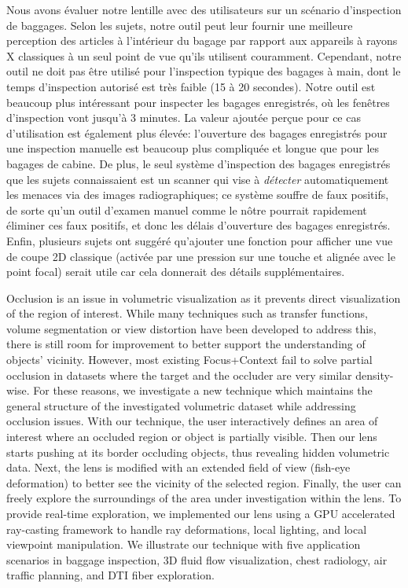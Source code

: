 Nous avons évaluer notre lentille avec des utilisateurs sur un scénario d'inspection de baggages. Selon les sujets, notre outil peut leur fournir une meilleure perception des articles à l’intérieur du bagage par rapport aux appareils à rayons X classiques à un seul point de vue qu’ils utilisent couramment. Cependant, notre outil ne doit pas être utilisé pour l'inspection typique des bagages à main, dont le temps d'inspection autorisé est très faible (15 à 20 secondes). Notre outil est beaucoup plus intéressant pour inspecter les bagages enregistrés, où les fenêtres d’inspection vont jusqu’à 3 minutes. La valeur ajoutée perçue pour ce cas d'utilisation est également plus élevée: l'ouverture des bagages enregistrés pour une inspection manuelle est beaucoup plus compliquée et longue que pour les bagages de cabine. De plus, le seul système d’inspection des bagages enregistrés que les sujets connaissaient est un scanner qui vise à \emph{détecter} automatiquement les menaces via des images radiographiques; ce système souffre de faux positifs, de sorte qu'un outil d'examen manuel comme le nôtre pourrait rapidement éliminer ces faux positifs, et donc les délais d'ouverture des bagages enregistrés. Enfin, plusieurs sujets ont suggéré qu’ajouter une fonction pour afficher une vue de coupe 2D classique (activée par une pression sur une touche et alignée avec le point focal) serait utile car cela donnerait des détails supplémentaires.



\NewPage






Occlusion is an issue in volumetric visualization as it prevents direct visualization of the region of interest. While many techniques such as transfer functions, volume segmentation or view distortion have been developed to address this, there is still room for improvement to better support the understanding of objects' vicinity. However, most existing Focus+Context fail to solve partial occlusion in datasets where the target and the occluder are very similar density-wise. For these reasons, we investigate a new technique which maintains the general structure of the investigated volumetric dataset while addressing occlusion issues. With our technique, the user interactively defines an area of interest where an occluded region or object is partially visible. Then our lens starts pushing at its border occluding objects, thus revealing hidden volumetric data. Next, the lens is modified with an extended field of view (fish-eye deformation) to better see the vicinity of the selected region. Finally, the user can freely explore the surroundings of the area under investigation within the lens. To provide real-time exploration, we implemented our lens using a GPU accelerated ray-casting framework
to handle ray deformations, local lighting, and local viewpoint manipulation. We illustrate our technique with five application scenarios in baggage inspection, 3D fluid flow visualization, chest radiology, air traffic planning, and DTI fiber exploration.

